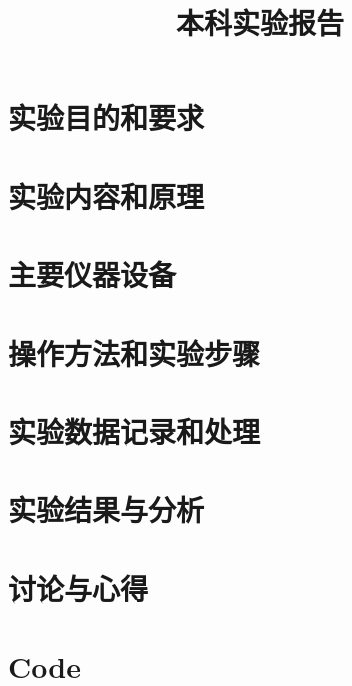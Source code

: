 \documentclass{zjureport}
\title{本科实验报告}
\date{\zhtoday}
\begin{document}
\makecover
\makeheader


\section{实验目的和要求}

\section{实验内容和原理}

\section{主要仪器设备}

\section{操作方法和实验步骤}

\section{实验数据记录和处理}

\section{实验结果与分析}

\section{讨论与心得}

\appendix
\section{Code}
\end{document}

